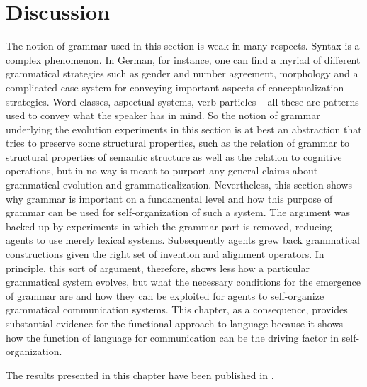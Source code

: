 \section{Discussion}
The notion of grammar used in this section is weak in many respects. 
Syntax is a complex phenomenon. In German, for instance, one can find 
a myriad of different grammatical strategies such as gender and 
number agreement, morphology and a complicated case system for 
conveying important aspects of conceptualization strategies. 
Word classes, aspectual systems, verb particles -- all these are 
patterns used to convey what the speaker has in mind. So the notion 
of grammar underlying the evolution experiments in this section is at 
best an abstraction that tries to preserve some structural properties, 
such as the relation of grammar to structural properties of semantic structure
as well as the relation to cognitive operations, but in no way is meant to 
purport any general claims about grammatical evolution and grammaticalization. Nevertheless, this section shows why grammar is important on a fundamental 
level and how this purpose of grammar can be used for self-organization of 
such a system. The argument was backed up by experiments in which the 
grammar part is removed, reducing agents to use merely lexical systems.
Subsequently agents grew back grammatical constructions given the right set 
of invention and alignment operators. In principle, this sort of argument, 
therefore, shows less how a particular grammatical system evolves, but what
the necessary conditions for the emergence of grammar are and how they can
be exploited for agents to self-organize grammatical communication systems. 
This chapter, as a consequence, provides substantial evidence for the functional 
approach to language because it shows how the function of language for 
communication can be the driving factor in self-organization.

The results presented in this chapter have been published in 
\cite{spranger2010space,spranger2012grammar}.

%